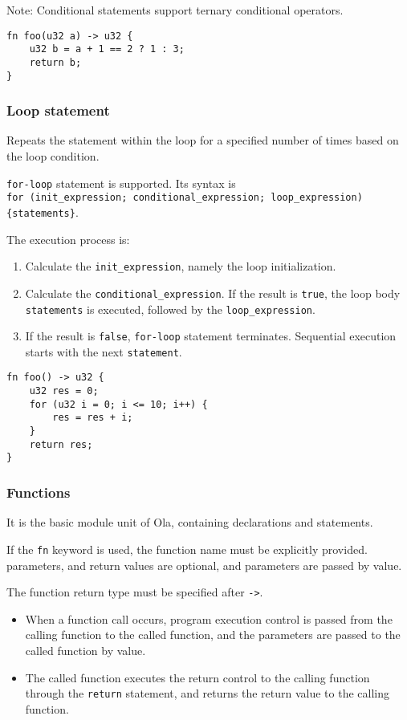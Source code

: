 Note: Conditional statements support ternary conditional operators.

\begin{lstlisting}
fn foo(u32 a) -> u32 {
    u32 b = a + 1 == 2 ? 1 : 3;
    return b;
}
\end{lstlisting}

\subsubsection*{Loop statement}

Repeats the statement within the loop for a specified number of times based on the loop condition.

\verb|for-loop| statement is supported. Its syntax is \\
\verb|for (init_expression; conditional_expression; loop_expression) {statements}|.

The execution process is:
\begin{enumerate}
    \item Calculate the \verb|init_expression|, namely the loop initialization.
    \item Calculate the \verb|conditional_expression|. If the result is \verb|true|, the loop body \verb|statements| is executed, followed by the \verb|loop_expression|.
    \item If the result is \verb|false|, \verb|for-loop| statement terminates. Sequential execution starts with the next \verb|statement|.
\end{enumerate}

\begin{lstlisting}
fn foo() -> u32 {
    u32 res = 0;
    for (u32 i = 0; i <= 10; i++) {
        res = res + i;
    }
    return res;
}
\end{lstlisting}

\subsubsection{Functions}

It is the basic module unit of Ola, containing declarations and statements.

If the \verb|fn| keyword is used, the function name must be explicitly provided. parameters, and return values are optional, and parameters are passed by value.

The function return type must be specified after \verb|->|.

\begin{itemize}
    \item When a function call occurs, program execution control is passed from the calling function to the called function, and the parameters are passed to the called function by value. 
    \item The called function executes the return control to the calling function through the \verb|return| statement, and returns the return value to the calling function.
\end{itemize}

